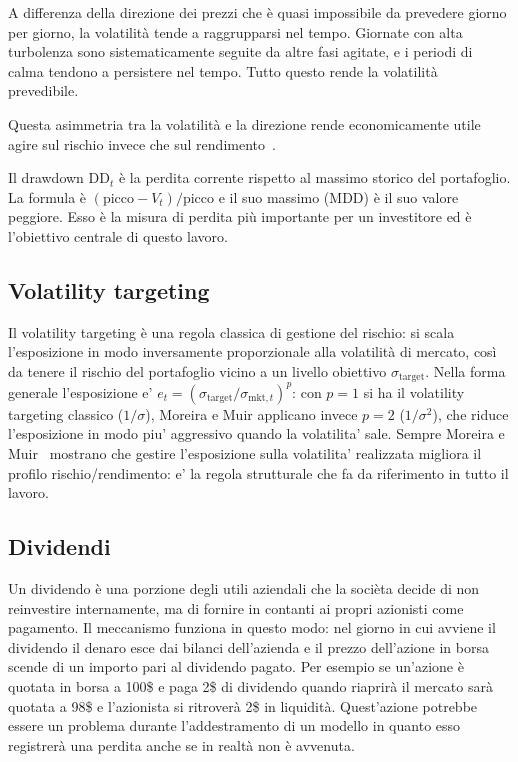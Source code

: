 A differenza della direzione dei prezzi che è quasi impossibile da prevedere giorno per giorno, la volatilità tende a raggrupparsi nel tempo. Giornate con alta turbolenza sono sistematicamente seguite da altre fasi agitate, e i periodi di calma tendono a persistere nel tempo. Tutto questo rende la volatilità prevedibile. 

Questa asimmetria tra la volatilità e la direzione rende economicamente utile agire sul rischio invece che sul rendimento~\cite{fleming2001economic}.

Il drawdown $\mathrm{DD}_t$ è la perdita corrente rispetto al massimo storico del portafoglio. La formula è $(\text{picco}-V_t)/\text{picco}$ e il suo massimo (MDD) è il suo valore peggiore. Esso è la misura di perdita più importante per un investitore ed è l'obiettivo centrale di questo lavoro.

\subsection{Volatility targeting}
Il volatility targeting è una regola classica di gestione del rischio: si scala l'esposizione in modo inversamente proporzionale alla volatilità di mercato, così da tenere il rischio del portafoglio vicino a un livello obiettivo $\sigma_\text{target}$. Nella forma generale l'esposizione e'
$e_t = (\sigma_{\text{target}}/\sigma_{\mathrm{mkt},t})^{p}$: con $p=1$ si
ha il volatility targeting classico ($1/\sigma$), Moreira e Muir applicano invece $p=2$ ($1/\sigma^2$), che riduce l'esposizione in modo piu'
aggressivo quando la volatilita' sale. Sempre Moreira e Muir~\cite{moreira2017volatility}
mostrano che gestire l'esposizione sulla volatilita' realizzata migliora il
profilo rischio/rendimento: e' la regola strutturale che fa da riferimento in
tutto il lavoro. 
\subsection{Dividendi}
Un dividendo è una porzione degli utili aziendali che la socièta decide di non reinvestire internamente, ma di fornire in contanti ai propri azionisti come pagamento.
Il meccanismo funziona in questo modo: nel giorno in cui avviene il dividendo il denaro esce dai bilanci dell'azienda e il prezzo dell'azione in borsa scende di un importo pari al dividendo pagato.
Per esempio se un'azione è quotata in borsa a 100\$ e paga 2\$ di dividendo quando riaprirà il mercato sarà quotata a 98\$ e l'azionista si ritroverà 2\$ in liquidità.
Quest'azione potrebbe essere un problema durante l'addestramento di un modello in quanto esso registrerà una perdita anche se in realtà non è avvenuta.


